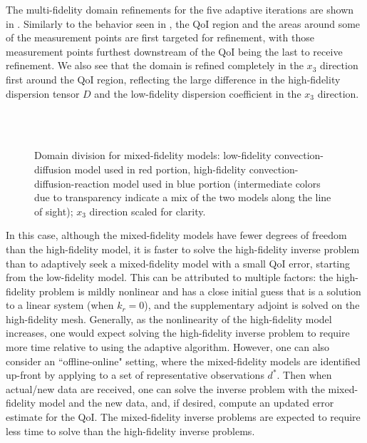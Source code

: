 The multi-fidelity domain refinements for the five adaptive iterations are shown in . Similarly to the behavior seen in , the QoI region and the areas around some of the measurement points are first targeted for refinement, with those measurement points furthest downstream of the QoI being the last to receive refinement. We also see that the domain is refined completely in the $x_3$ direction first around the QoI region, reflecting the large difference in the high-fidelity dispersion tensor $D$ and the low-fidelity dispersion coefficient in the $x_3$ direction.
%
\begin{figure}[htbp]
\centering
{}
\hfill
{}
\\
\hfill
{} \\
\hfill
{}

\caption{Domain division for mixed-fidelity models: low-fidelity convection-diffusion model used in red portion, high-fidelity convection-diffusion-reaction model used in blue portion (intermediate colors due to transparency indicate a mix of the two models along the line of sight); $x_3$ direction scaled for clarity.}
\label{fig:divvy3D_diffmesh}
\end{figure}
%

In this case, although the mixed-fidelity models have fewer degrees of freedom than the high-fidelity model, it is faster to solve the high-fidelity inverse problem than to adaptively seek a mixed-fidelity model with a small QoI error, starting from the low-fidelity model. This can be attributed to multiple factors: the high-fidelity problem is mildly nonlinear and has a close initial guess that is a solution to a linear system (when $k_r=0$), and the supplementary adjoint is solved on the high-fidelity mesh. Generally, as the nonlinearity of the high-fidelity model increases, one would expect solving the high-fidelity inverse problem to require more time relative to using the adaptive algorithm. However, one can also consider an ``offline-online" setting, where the mixed-fidelity models are identified up-front by applying  to a set of representative observations $d^*$. Then when actual/new data are received, one can solve the inverse problem with the mixed-fidelity model and the new data, and, if desired, compute an updated error estimate for the QoI. The mixed-fidelity inverse problems are expected to require less time to solve than the high-fidelity inverse problems.

